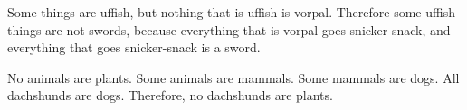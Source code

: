 \begin{exercises}
\item Some things are uffish, but nothing that is uffish is vorpal. Therefore some uffish things are not swords, because everything that is vorpal goes snicker-snack, and everything that goes snicker-snack is a sword. 






\item No animals are plants. Some animals are mammals. Some mammals are dogs. All dachshunds are dogs. Therefore, no dachshunds are plants.





\end{exercises}
